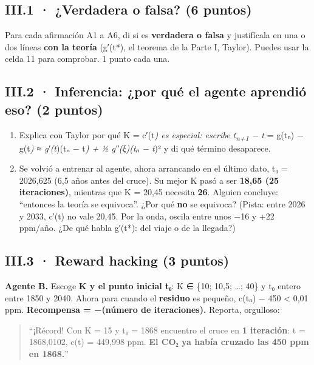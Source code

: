 \subsection{III.1 · ¿Verdadera o falsa? (6 puntos)}

Para cada afirmación A1 a A6, di si es \textbf{verdadera o falsa} y justifícala en una o dos líneas \textbf{con la teoría} (g′(t*), el teorema de la Parte I, Taylor). Puedes usar la celda 11 para comprobar. 1 punto cada una.

\subsection{III.2 · Inferencia: ¿por qué el agente aprendió eso? (2 puntos)}

\begin{enumerate}
\def\labelenumi{(\alph{enumi})}
\item
  Explica con Taylor por qué K = c′(t\emph{) es especial: escribe t\textsubscript{n+1} − t} = g(tₙ) − g(t\emph{) ≈ g′(t})(tₙ − t\emph{) + ½ g″(ξ)(tₙ − t})² y di qué término desaparece.
\item
  Se volvió a entrenar al agente, ahora arrancando en el último dato, t₀ = 2026,625 (6,5 años antes del cruce). Su mejor K pasó a ser \textbf{18,65 (25 iteraciones)}, mientras que K = 20,45 necesita \textbf{26}. Alguien concluye: ``entonces la teoría se equivoca''. ¿Por qué \textbf{no} se equivoca? (Pista: entre 2026 y 2033, c′(t) no vale 20,45. Por la onda, oscila entre unos −16 y +22 ppm/año. ¿De qué habla g′(t*): del viaje o de la llegada?)
\end{enumerate}

\subsection{III.3 · Reward hacking (3 puntos)}

\textbf{Agente B.} Escoge \textbf{K y el punto inicial t₀}: K ∈ \{10; 10,5; \ldots; 40\} y t₀ entero entre 1850 y 2040. Ahora para cuando el \textbf{residuo} es pequeño, \textbar c(tₙ) − 450\textbar{} \textless{} 0,01 ppm. \textbf{Recompensa = −(número de iteraciones).} Reporta, orgulloso:

\begin{quote}
``¡Récord! Con K = 15 y t₀ = 1868 encuentro el cruce en \textbf{1 iteración}: t = 1868,0102, c(t) = 449,998 ppm. \textbf{El CO₂ ya había cruzado las 450 ppm en 1868.}''
\end{quote}

